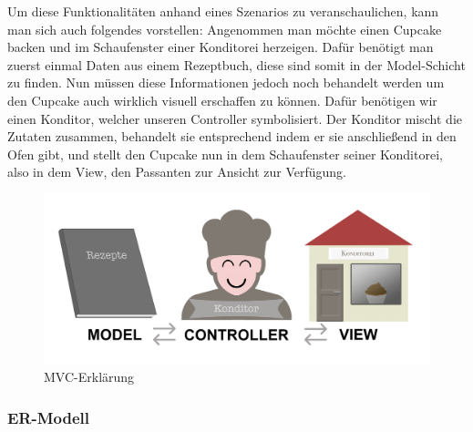 Um diese Funktionalitäten anhand eines Szenarios zu veranschaulichen, kann man sich auch folgendes vorstellen:
Angenommen man möchte einen Cupcake backen und im Schaufenster einer Konditorei herzeigen. Dafür benötigt man zuerst einmal Daten aus einem Rezeptbuch, diese sind somit in der Model-Schicht zu finden.
Nun müssen diese Informationen jedoch noch behandelt werden um den Cupcake auch wirklich visuell erschaffen zu können. Dafür benötigen wir einen Konditor, welcher unseren Controller symbolisiert. 
Der Konditor mischt die Zutaten zusammen, behandelt sie entsprechend indem er sie anschließend in den Ofen gibt, und stellt den Cupcake nun in dem Schaufenster seiner Konditorei, also in dem View, den Passanten zur Ansicht zur Verfügung.
			\begin{figure}[H]
			\begin{centering}
			\includegraphics[width = 1\textwidth]{Bilder/Jok_mvc.png}
			\par\end{centering}
			\caption{MVC-Erklärung}
			\label{MVC-Erklärung}
			\end{figure}

    \subsubsection{ER-Modell}

